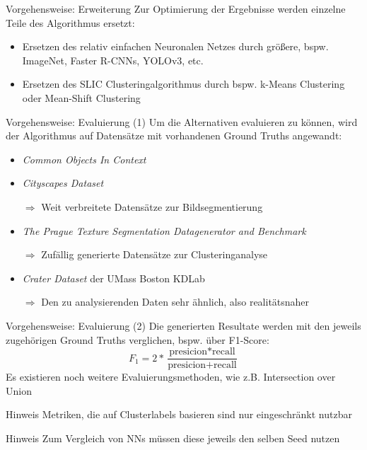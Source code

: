 \documentclass[9pt]{beamer}
\begin{document}
\begin{frame}{Vorgehensweise: Erweiterung}
Zur Optimierung der Ergebnisse werden einzelne Teile des Algorithmus ersetzt:
\begin{itemize}
	\item Ersetzen des relativ einfachen Neuronalen Netzes durch größere, bspw. ImageNet, Faster R-CNNs, YOLOv3, etc.
	\item Ersetzen des SLIC Clusteringalgorithmus durch bspw. k-Means Clustering oder Mean-Shift Clustering
\end{itemize}	
\end{frame}

\begin{frame}{Vorgehensweise: Evaluierung (1)}
Um die Alternativen evaluieren zu können, wird der Algorithmus auf Datensätze mit vorhandenen Ground Truths angewandt:
\medskip
\begin{itemize}
	\item \textit{Common Objects In Context}\cite{LMBHPRDZ:ECCV:2014}
	\item \textit{Cityscapes Dataset}\cite{Cordts2016Cityscapes}
	\item[$\Rightarrow$] Weit verbreitete Datensätze zur Bildsegmentierung
	\medskip
	\item \textit{The Prague Texture Segmentation Datagenerator and Benchmark}\cite{mikevs2015benchmarking}
	\item[$\Rightarrow$] Zufällig generierte Datensätze zur Clusteringanalyse
	\medskip
	\item \textit{Crater Dataset} der UMass Boston
	 KDLab\cite{umass_craters}
	\item[$\Rightarrow$] Den zu analysierenden Daten sehr ähnlich, also realitätsnaher
\end{itemize}
\end{frame}

\begin{frame}{Vorgehensweise: Evaluierung (2)}
Die generierten Resultate werden mit den jeweils zugehörigen Ground Truths verglichen, bspw. über F1-Score:
$$F_1 = 2*\frac{\text{presicion}*\text{recall}}{\text{presicion}+\text{recall}}$$
Es existieren noch weitere Evaluierungsmethoden, wie z.B. Intersection over Union
\pause
\bigskip
\begin{block}{Hinweis}
	Metriken, die auf Clusterlabels basieren sind nur eingeschränkt nutzbar
\end{block}
\pause
\bigskip
\begin{block}{Hinweis}
	Zum Vergleich von NNs müssen diese jeweils den selben Seed nutzen
\end{block}
\end{frame}
\end{document}
